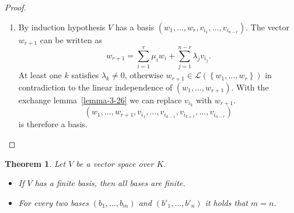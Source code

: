 \documentclass[a4paper,landscape,twocolumn]{article}
\newcommand\set[1]{\left\{#1\right\}}
\newtheorem{theorem}{Theorem}
\begin{document}
\begin{proof}
\begin{description}
\begin{enumerate}
        \item
          By induction hypothesis $V$ has a basis $(w_1, \ldots, w_r, v_{i_1}, \ldots, v_{i_{n-r}})$.
          The vector $w_{r+1}$ can be written as
          \[ w_{r+1} = \sum_{i=1}^r \mu_i w_i + \sum_{j=1}^{n-r} \lambda_j v_{i_j}. \]
          At least one $k$ satisfies $\lambda_k \neq 0$, otherwise $w_{r+1} \in \mathcal L(\set{w_1, \ldots, w_r})$
          in contradiction to the linear independence of $(w_1, \ldots, w_{r+1})$.
          With the exchange lemma~\ref{lemma-3-26} we can replace $v_{i_k}$ with $w_{r+1}$.
          \[ (w_1, \ldots, w_{r+1}, v_{i_1}, \ldots, v_{i_{k-1}}, v_{i_{k+1}}, \ldots, v_{i_{n-r}}) \]
          is therefore a basis.
%
%
      \end{enumerate}
  \end{description}
\end{proof}
%
\begin{theorem}
  Let $V$ be a vector space over $K$.
  \begin{itemize}
    \item If $V$ has a finite basis, then all bases are finite.
    \item For every two bases $(b_1, \dots, b_m)$ and $(b'_1, \dots, b'_n)$ it holds that $m = n$.
  \end{itemize}
\end{theorem}
\end{document}
